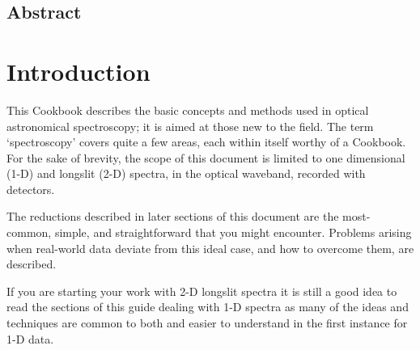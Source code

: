 \begin{htmlonly}
  \section{Abstract}
\end{htmlonly}

\stardocabstract
 \newpage
 \begin{latexonly}
   \setlength{\parskip}{0mm}
   \latexonlytoc
   \setlength{\parskip}{\medskipamount}
   \markright{\stardocname}
 \end{latexonly}
\cleardoublepage
\renewcommand{\thepage}{\arabic{page}}
\setcounter{page}{1}


\section{Introduction}

This Cookbook describes the basic concepts and methods used in optical
astronomical spectroscopy; it is aimed at those new to the field.
The term `spectroscopy' covers quite a few areas, each within itself
worthy of a Cookbook.
For the sake of brevity, the scope of this document is limited to
one dimensional (1-D) and longslit (2-D) spectra, in the optical waveband, recorded with
 detectors. 

The reductions described in later sections of this document are the
most-common, simple, and straightforward that you might encounter.
Problems arising when real-world data deviate from this ideal case,
and how to overcome them, are described.

If you are starting your work with 2-D longslit spectra it is still a
good idea to read the sections of this guide dealing with 1-D spectra
as many of the ideas and techniques are common to both and easier to
understand in the first instance for 1-D data.

